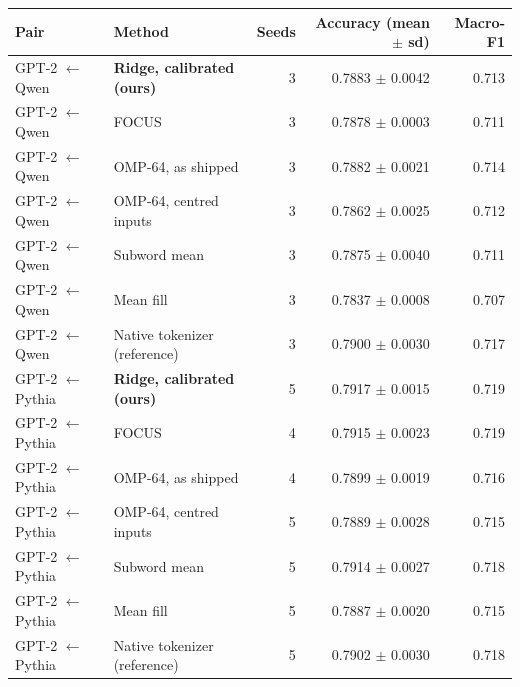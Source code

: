 \begin{tabular}{llrrr}
\toprule
Pair & Method & Seeds & Accuracy (mean $\pm$ sd) & Macro-F1 \\
\midrule
GPT-2 $\leftarrow$ Qwen & \textbf{Ridge, calibrated (ours)} & 3 & 0.7883 $\pm$ 0.0042 & 0.713 \\
GPT-2 $\leftarrow$ Qwen & FOCUS & 3 & 0.7878 $\pm$ 0.0003 & 0.711 \\
GPT-2 $\leftarrow$ Qwen & OMP-64, as shipped & 3 & 0.7882 $\pm$ 0.0021 & 0.714 \\
GPT-2 $\leftarrow$ Qwen & OMP-64, centred inputs & 3 & 0.7862 $\pm$ 0.0025 & 0.712 \\
GPT-2 $\leftarrow$ Qwen & Subword mean & 3 & 0.7875 $\pm$ 0.0040 & 0.711 \\
GPT-2 $\leftarrow$ Qwen & Mean fill & 3 & 0.7837 $\pm$ 0.0008 & 0.707 \\
GPT-2 $\leftarrow$ Qwen & Native tokenizer (reference) & 3 & 0.7900 $\pm$ 0.0030 & 0.717 \\
\midrule
GPT-2 $\leftarrow$ Pythia & \textbf{Ridge, calibrated (ours)} & 5 & 0.7917 $\pm$ 0.0015 & 0.719 \\
GPT-2 $\leftarrow$ Pythia & FOCUS & 4 & 0.7915 $\pm$ 0.0023 & 0.719 \\
GPT-2 $\leftarrow$ Pythia & OMP-64, as shipped & 4 & 0.7899 $\pm$ 0.0019 & 0.716 \\
GPT-2 $\leftarrow$ Pythia & OMP-64, centred inputs & 5 & 0.7889 $\pm$ 0.0028 & 0.715 \\
GPT-2 $\leftarrow$ Pythia & Subword mean & 5 & 0.7914 $\pm$ 0.0027 & 0.718 \\
GPT-2 $\leftarrow$ Pythia & Mean fill & 5 & 0.7887 $\pm$ 0.0020 & 0.715 \\
GPT-2 $\leftarrow$ Pythia & Native tokenizer (reference) & 5 & 0.7902 $\pm$ 0.0030 & 0.718 \\
\bottomrule
\end{tabular}

